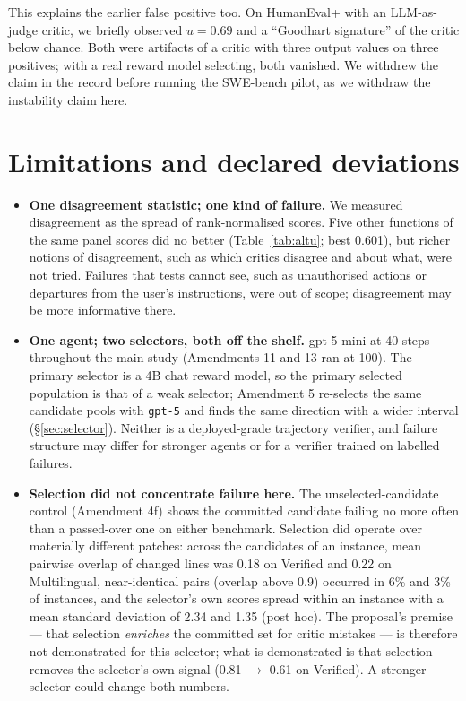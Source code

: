 \documentclass[11pt]{article}
\begin{document}
This explains the earlier false positive too. On HumanEval+ with an LLM-as-judge critic, we briefly observed $u=0.69$ and a ``Goodhart signature'' of the critic below chance. Both were artifacts of a critic with three output values on three positives; with a real reward model selecting, both vanished. We withdrew the claim in the record before running the SWE-bench pilot, as we withdraw the instability claim here.

\FloatBarrier
\section{Limitations and declared deviations}\label{sec:limits}
\begin{itemize}[leftmargin=1.2em,itemsep=1pt]
\item \textbf{One disagreement statistic; one kind of failure.} We measured disagreement as the spread of rank-normalised scores. Five other functions of the same panel scores did no better (Table~\ref{tab:altu}; best 0.601), but richer notions of disagreement, such as which critics disagree and about what, were not tried. Failures that tests cannot see, such as unauthorised actions or departures from the user's instructions, were out of scope; disagreement may be more informative there.
\item \textbf{One agent; two selectors, both off the shelf.} gpt-5-mini at 40 steps throughout the main study (Amendments 11 and 13 ran at 100). The primary selector is a 4B chat reward model, so the primary selected population is that of a weak selector; Amendment 5 re-selects the same candidate pools with \texttt{gpt-5} and finds the same direction with a wider interval (\S\ref{sec:selector}). Neither is a deployed-grade trajectory verifier, and failure structure may differ for stronger agents or for a verifier trained on labelled failures.
\item \textbf{Selection did not concentrate failure here.} The unselected-candidate control (Amendment 4f) shows the committed candidate failing no more often than a passed-over one on either benchmark. Selection did operate over materially different patches: across the candidates of an instance, mean pairwise overlap of changed lines was 0.18 on Verified and 0.22 on Multilingual, near-identical pairs (overlap above 0.9) occurred in 6\% and 3\% of instances, and the selector's own scores spread within an instance with a mean standard deviation of 2.34 and 1.35 (post hoc). The proposal's premise --- that selection \emph{enriches} the committed set for critic mistakes --- is therefore not demonstrated for this selector; what is demonstrated is that selection removes the selector's own signal (0.81 $\to$ 0.61 on Verified). A stronger selector could change both numbers.

\end{itemize}
\end{document}
